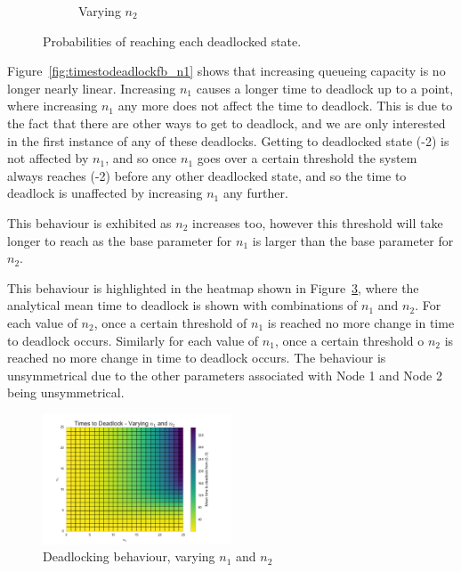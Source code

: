 \documentclass{article}
\begin{document}
\begin{figure}[!htbp]
\begin{subfigure}[b]{0.5\textwidth}
  \caption{Varying $n_2$}
  \label{fig:absprobn2}
\end{subfigure}
\caption{Probabilities of reaching each deadlocked state.}
\label{fig:absorbingprobs}
\end{figure}

Figure~\ref{fig:timestodeadlockfb_n1} shows that increasing queueing capacity is no longer nearly linear.
Increasing $n_1$ causes a longer time to deadlock up to a point, where increasing $n_1$ any more does not affect the time to deadlock.
This is due to the fact that there are other ways to get to deadlock, and we are only interested in the first instance of any of these deadlocks.
Getting to deadlocked state (-2) is not affected by $n_1$, and so once $n_1$ goes over a certain threshold the system always reaches (-2) before any other deadlocked state, and so the time to deadlock is unaffected by increasing $n_1$ any further.

This behaviour is exhibited as $n_2$ increases too, however this threshold will take longer to reach as the base parameter for $n_1$ is larger than the base parameter for $n_2$.

This behaviour is highlighted in the heatmap shown in Figure~\ref{fig:capacitiesheatmap}, where the analytical mean time to deadlock is shown with combinations of $n_1$ and $n_2$.
For each value of $n_2$, once a certain threshold of $n_1$ is reached no more change in time to deadlock occurs.
Similarly for each value of $n_1$, once a certain threshold o $n_2$ is reached no more change in time to deadlock occurs.
The behaviour is unsymmetrical due to the other parameters associated with Node 1 and Node 2 being unsymmetrical.

\begin{figure}[!htbp]
  \begin{center}
  \includegraphics[width=0.5\textwidth]{images/n1n2_heatmap}
  \caption{Deadlocking behaviour, varying $n_1$ and $n_2$}
  \label{fig:capacitiesheatmap}
  \end{center}
\end{figure}
\end{document}

